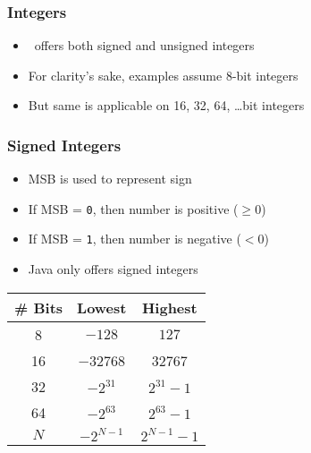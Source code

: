 \begin{frame}
\begin{overprint}
\begin{center}
    \end{center}
  \end{overprint}
\end{frame}

\begin{frame}
  \frametitle{Integers}
  \begin{itemize}
    \item \cpp\ offers both signed and unsigned integers
    \item For clarity's sake, examples assume 8-bit integers
    \item But same is applicable on 16, 32, 64, \dots bit integers
  \end{itemize}
\end{frame}

\begin{frame}
  \frametitle{Signed Integers}
  \begin{itemize}
    \item MSB is used to represent sign
    \item If MSB = \texttt{0}, then number is positive ($\geq 0$)
    \item If MSB = \texttt{1}, then number is negative ($< 0$)
    \item Java only offers signed integers
  \end{itemize}
  \begin{center}
  \end{center}
  \begin{center}
    \begin{tabular}{ccc}
      \toprule
      \textbf{\# Bits} & \textbf{Lowest} & \textbf{Highest} \\
      \midrule
      8 & $-128$ & $127$ \\
      16 & \num{-32768} & \num{32767} \\
      32 & $-2^{31}$ & $2^{31}-1$ \\
      64 & $-2^{63}$ & $2^{63}-1$ \\
      $N$ & $-2^{N-1}$ & $2^{N-1}-1$ \\
      \bottomrule
    \end{tabular}
  \end{center}
\end{frame}

